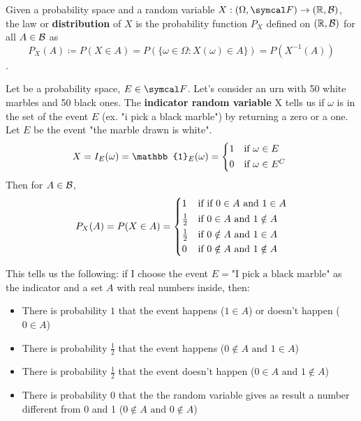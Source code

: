 \begin{definition}
    Given a probability space \probspace{} and a random variable $X:\borel\to (\bbR, \calB)$, the law or \textbf{distribution} of $X$ is the probability function $P_X$ defined on $(\mathbb{R}, \mathcal{B})$ for all $A \in \mathcal{B}$ as
    \begin{equation*}
        P_X(A) \coloneq P(X \in A) = P(\{\omega \in \Omega:X(\omega)\in A\})=P(X^{-1}(A))
    \end{equation*}.
\end{definition}
\begin{example}
    Let \probspace{} be a probability space, $E \in \eff$. Let's consider an urn with 50 white marbles and 50 black ones. The \textbf{indicator random variable} X tells us if $\omega$ is in the set of the event $E$ (ex. "i pick a black marble") by returning a zero or a one. Let $E$ be the event "the marble drawn is white".
    \begin{equation*}
        X = I_E(\omega)=\mathbb{1}_E(\omega)=\begin{cases*}
            1 & if $\omega \in E$\\
            0 & if $\omega \in E^C$
        \end{cases*}
    \end{equation*}
    Then for $A \in \mathcal{B}$,
    \begin{equation*}
        P_X(A)=P(X \in A) = \begin{cases*}
            1 & if if $0 \in A$ and $1 \in A$\\
            \frac{1}{2} & if $0 \in A$ and $1 \notin A$\\
            \frac{1}{2} & if $0 \notin A$ and $1 \in A$\\
            0 & if $0 \notin A$ and $1 \notin A$
        \end{cases*}
    \end{equation*}
\end{example}
This tells us the following: if I choose the event $E=\text{"I pick a black marble"}$ as the indicator and a set $A$ with real numbers inside, then:
\begin{itemize}
    \item There is probability $1$ that the event happens ($1 \in A$) or doesn't happen ($0 \in A$)
    \item There is probability $\frac{1}{2}$ that the event happens ($0 \notin A \text{ and } 1 \in A$)
    \item There is probability $\frac{1}{2}$ that the event doesn't happen ($0 \in A \text{ and } 1 \notin A$)
    \item There is probability $0$ that the the random variable gives as result a number different from 0 and 1 ($0 \notin A \text{ and } 0 \notin A$)
\end{itemize}
